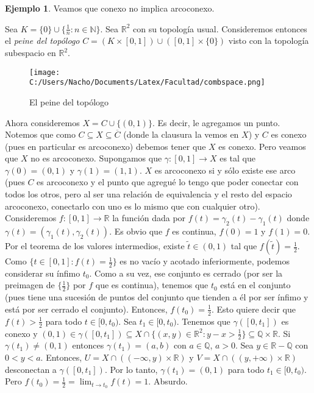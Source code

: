\documentclass[12pt]{book}
\theoremstyle{definition}
\newtheorem{ex}[teo]{Ejemplo}
\newcommand{\RR}{\mathbb{R}}      %
\newcommand{\NN}{\mathbb{N}}
\newcommand{\QQ}{\mathbb{Q}}
\begin{document}
\begin{ex}
Veamos que conexo no implica arcoconexo.

Sea $K = \{0\}\cup \{\frac{1}{n}:n\in\NN\}$. Sea $\RR^2$ con su topología usual. Consideremos entonces el \textit{peine del topólogo} $C = (K\times [0,1]) \cup ([0,1]\times \{0\})$ visto con la topología subespacio en $\RR^2$.
\begin{figure}
	\centering
		\texttt{[image: C:/Users/Nacho/Documents/Latex/Facultad/combspace.png]}
	\caption{El peine del topólogo}
	\label{fig:combspace}
\end{figure}

Ahora consideremos $X = C\cup \{(0,1)\}$. Es decir, le agregamos un punto. Notemos que como $C\subseteq X\subseteq \overline{C}$ (donde la clausura la vemos en $X$) y $C$ es conexo (pues en particular es arcoconexo) debemos tener que $X$ es conexo. Pero veamos que $X$ no es arcoconexo. Supongamos que $\gamma:[0,1]\to X$ es tal que $\gamma(0)=(0,1)$ y $\gamma(1)=(1,1)$. $X$ es arcoconexo si y sólo existe ese arco (pues $C$ es arcoconexo y el punto que agregué lo tengo que poder conectar con todos los otros, pero al ser una relación de equivalencia y el resto del espacio arcoconexo, conectarlo con uno es lo mismo que con cualquier otro). Consideremos $f:[0,1]\to\RR$ la función dada por $f(t) = \gamma_2(t) - \gamma_1(t)$ donde $\gamma(t) = (\gamma_1(t),\gamma_2(t))$. Es obvio que $f$ es continua, $f(0)=1$ y $f(1)=0$. Por el teorema de los valores intermedios, existe $\tilde{t}\in (0,1)$ tal que $f(\tilde{t}) = \frac{1}{2}$. Como $\{t\in [0,1] : f(t)=\frac{1}{2}\}$ es no vacío y acotado inferiormente, podemos considerar su ínfimo $t_0$. Como a su vez, ese conjunto es cerrado (por ser la preimagen de $\{\frac{1}{2}\}$ por $f$ que es continua), tenemos que $t_0$ está en el conjunto (pues tiene una sucesión de puntos del conjunto que tienden a él por ser ínfimo y está por ser cerrado el conjunto). Entonces, $f(t_0)=\frac{1}{2}$. Esto quiere decir que $f(t)>\frac{1}{2}$ para todo $t\in [0,t_0)$. Sea $t_1\in [0,t_0)$. Tenemos que $\gamma([0,t_1])$ es conexo y $(0,1)\in \gamma([0,t_1])\subseteq X\cap \{(x,y)\in\RR^2 : y-x>\frac{1}{2}\}\subseteq \QQ\times \RR$. Si $\gamma(t_1)\neq (0,1)$ entonces $\gamma(t_1)=(a,b)$ con $a\in\QQ$, $a>0$. Sea $y\in\RR-\QQ$ con $0<y<a$. Entonces, $U = X\cap ((-\infty,y)\times \RR)$ y $V=X\cap ((y,+\infty)\times \RR)$ desconectan a $\gamma([0,t_1])$. Por lo tanto, $\gamma(t_1)=(0,1)$ para todo $t_1\in [0,t_0)$. Pero $f(t_0) = \frac{1}{2} = \lim_{t\to t_0} f(t) = 1$. Absurdo.

\end{ex}
\end{document}
